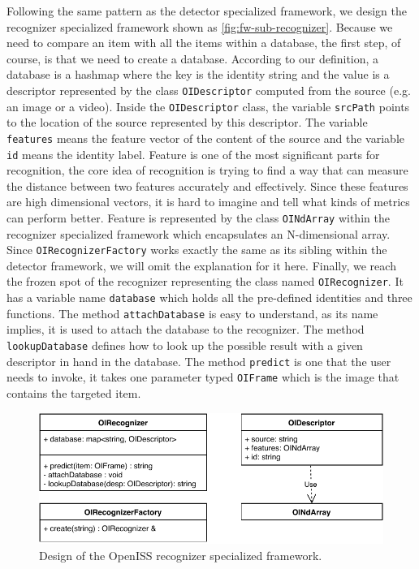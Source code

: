 Following the same pattern as the detector specialized framework, we design the
recognizer specialized framework shown as \autoref{fig:fw-sub-recognizer}.
Because we need to compare an item with all the items within a database, the
first step, of course, is that we need to create a database. According to our
definition, a database is a hashmap where the key is the identity string and
the value is a descriptor represented by the class \texttt{OIDescriptor}
computed from the source (e.g. an image or a video).
Inside the \texttt{OIDescriptor} class, the variable \texttt{srcPath} points to
the location of the source represented by this descriptor. The variable
\texttt{features} means the feature vector of the content of the source and the
variable \texttt{id} means the identity label.
Feature is one of the most significant parts for recognition, the core idea of
recognition is trying to find a way that can measure the distance between two
features accurately and effectively. Since these features are high dimensional
vectors, it is hard to imagine and tell what kinds of metrics can perform
better.
Feature is represented by the class \texttt{OINdArray} within the recognizer
specialized framework which encapsulates an N-dimensional array.
Since \texttt{OIRecognizerFactory} works exactly the same as its sibling within
the detector framework, we will omit the explanation for it here.
Finally, we reach the frozen spot of the recognizer representing the class
named \texttt{OIRecognizer}. It has a variable name \texttt{database} which
holds all the pre-defined identities and three functions.
The method \texttt{attachDatabase} is easy to understand, as its name implies, it 
is used to attach the database to the recognizer.
The method \texttt{lookupDatabase} defines how to look up the possible result
with a given descriptor in hand in the database.
The method \texttt{predict} is one that the user needs to invoke, it takes one 
parameter typed \texttt{OIFrame} which is the image that contains the targeted item.

\begin{figure}
    \centering
    \includegraphics[scale=0.8]{figures/framework_sub_recognizer.pdf}
    \caption{Design of the OpenISS recognizer specialized framework.}
    \label{fig:fw-sub-recognizer}
\end{figure}

